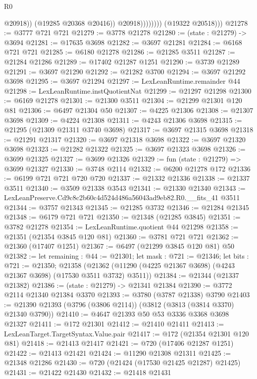 \begin{lexlean}{R0}
\begin{coremodule}
                              @20918))
                          (@19285 @20368 @20416))
                        @20918))))))))
        (@19322 @20518)))
@21278 := @3777 @721 @721
@21279 := @3778 @21278
@21280 := (state : @21279) -> @3694
@21281 := @17635 @3698
@21282 := @3697 @21281
@21284 := @6168 @721 @721
@21285 := @6180 @21278
@21286 := @21285 @3511
@21287 := @21284 @21286
@21289 := @17402 @21287 @1251
@21290 := @3739 @21289
@21291 := @3697 @21290
@21292 := @21282 @3700
@21294 := @3697 @21292 @3698
@21295 := @3697 @21294
@21297 := LexLeanRuntime.remainder @44
@21298 := LexLeanRuntime.instQuotientNat
@21299 := @21297 @21298
@21300 := @6169 @21278
@21301 := @21300 @3511
@21304 := @21299 @21301 @120 @81
@21306 := @6497 @21304 @50
@21307 := @4225 @21306
@21308 := @21307 @3698
@21309 := @4224 @21308
@21311 := @4243 @21306 @3698
@21315 := @21295 (@21309 @21311 @3740 @3698)
@21317 := @3697 @21315 @3698
@21318 := @21291 @21317
@21320 := @3697 @21318 @3698
@21322 := @3697 @21320 @3698
@21323 := @21282 @21322
@21325 := @3697 @21323 @3698
@21326 := @3699 @21325
@21327 := @3699 @21326
@21329 := fun (state : @21279) => @3699 @21327
@21330 := @3748 @2114
@21332 := @6200 @21278 @172
@21336 := @6199 @721 @721 @720 @720
@21337 := @21332 @21336
@21338 := @21337 @3511
@21340 := @3509 @21338 @3543
@21341 := @21330 @21340
@21343 := LexLeanPreserve.Cd9c8c2b60c4d524d486a56043ad9eb82.R0.__fits_41 @3511
@21344 := @3757 @21343
@21345 := @21285 @3732
@21346 := @21284 @21345
@21348 := @6179 @721 @721
@21350 := @21348 (@21285 @3845)
@21351 := @3782 @21278
@21354 := LexLeanRuntime.quotient @44 @21298
@21358 := @21351 (@21354 @3845 @120 @81)
@21360 := @3781 @721 @721
@21362 := @21360 (@17407 @1251)
@21367 := @6497 (@21299 @3845 @120 @81) @50
@21382 := let remaining : @44 := @21301;
  let mask : @721 := @21346;
  let bits : @721 := @21350;
  @21358 (@21362 (@11290 (@4225 @21367 @3698) (@4243 @21367 @3698) (@17530 @3511 @3732) @3511))
@21384 := @21344 (@21337 @21382)
@21386 := (state : @21279) -> @21341 @21384
@21390 := @3772 @2114 @21340 @21384 @3370
@21393 := @3780 (@3787 @21338) @3790
@21403 := @21390 @21393 (@3796 (@3806 @2114)) (@3812 (@3813 (@3814 @3370) @21340 @3790))
@21410 := @4647 @21393 @50 @53 @3336 @3368 @3698 @21327
@21411 := @172 @21301
@21412 := @21410 @21411
@21413 := LexLeanTarget.TargetSyntax.Value.pair
@21417 := @172 (@21354 @21301 @120 @81)
@21418 := @21413 @21417
@21421 := @720 (@17406 @21287 @1251)
@21422 := @21413 @21421
@21424 := @11290 @21308 @21311
@21425 := @21348 @21286
@21430 := @720 (@21424 (@17530 @21425 @21287) @21425)
@21431 := @21422 @21430
@21432 := @21418 @21431

\end{coremodule}
\end{lexlean}
